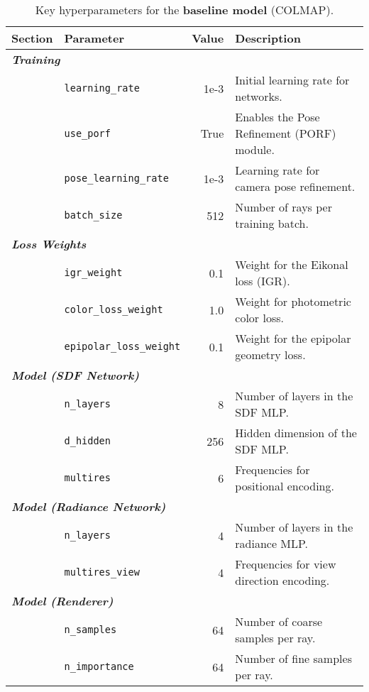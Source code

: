 \documentclass{article}
\begin{document}
\begin{table}[h!]
    \centering
    \captionsetup{justification=centering}
    \caption{Key hyperparameters for the \textbf{baseline model} (COLMAP).}
    \label{tab:hyperparams_baseline}
    \begin{tabular}{llrl}
        \toprule
        \textbf{Section} & \textbf{Parameter} & \textbf{Value} & \textbf{Description} \\
        \midrule
        \multicolumn{4}{l}{\textit{\textbf{Training}}} \\
        & \texttt{learning\_rate} & 1e-3 & Initial learning rate for networks. \\
        & \texttt{use\_porf} & True & Enables the Pose Refinement (PORF) module. \\
        & \texttt{pose\_learning\_rate} & 1e-3 & Learning rate for camera pose refinement. \\
        & \texttt{batch\_size} & 512 & Number of rays per training batch. \\
        \midrule
        \multicolumn{4}{l}{\textit{\textbf{Loss Weights}}} \\
        & \texttt{igr\_weight} & 0.1 & Weight for the Eikonal loss (IGR). \\
        & \texttt{color\_loss\_weight} & 1.0 & Weight for photometric color loss. \\
        & \texttt{epipolar\_loss\_weight} & 0.1 & Weight for the epipolar geometry loss. \\
        \midrule
        \multicolumn{4}{l}{\textit{\textbf{Model (SDF Network)}}} \\
        & \texttt{n\_layers} & 8 & Number of layers in the SDF MLP. \\
        & \texttt{d\_hidden} & 256 & Hidden dimension of the SDF MLP. \\
        & \texttt{multires} & 6 & Frequencies for positional encoding. \\
        \midrule
        \multicolumn{4}{l}{\textit{\textbf{Model (Radiance Network)}}} \\
        & \texttt{n\_layers} & 4 & Number of layers in the radiance MLP. \\
        & \texttt{multires\_view} & 4 & Frequencies for view direction encoding. \\
        \midrule
        \multicolumn{4}{l}{\textit{\textbf{Model (Renderer)}}} \\
        & \texttt{n\_samples} & 64 & Number of coarse samples per ray. \\
        & \texttt{n\_importance} & 64 & Number of fine samples per ray. \\
        \bottomrule
    \end{tabular}
\end{table}
\end{document}
